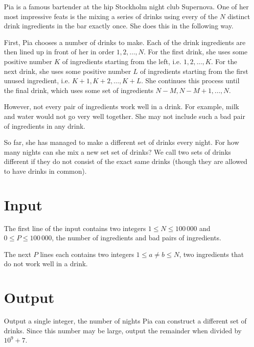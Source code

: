 Pia is a famous bartender at the hip Stockholm night club Supernova.
One of her most impressive feats is the mixing a series of drinks using every of the $N$ distinct drink ingredients in the bar exactly once.
She does this in the following way.

First, Pia chooses a number of drinks to make.
Each of the drink ingredients are then lined up in front of her in order $1, 2, \dots, N$.
For the first drink, she uses some positive number $K$ of ingredients starting from the left, i.e. $1, 2, ..., K$.
For the next drink, she uses some positive number $L$ of ingredients starting from the first unused ingredient, i.e. $K + 1, K + 2, \dots, K + L$.
She continues this process until the final drink, which uses some set of ingredients $N - M, N - M + 1, \dots, N$.

However, not every pair of ingredients work well in a drink.
For example, milk and water would not go very well together.
She may not include such a bad pair of ingredients in any drink.

So far, she has managed to make a different set of drinks every night.
For how many nights can she mix a new set set of drinks?
We call two sets of drinks different if they do not consist of the exact same drinks (though they are allowed to have drinks in common).

\section*{Input}
The first line of the input contains two integers $1 \le N \le 100\,000$ and $0 \le P \le 100\,000$, the number of ingredients and bad pairs of ingredients.

The next $P$ lines each contains two integers $1 \le a \not= b \le N$, two ingredients that do not work well in a drink.

\section*{Output}
Output a single integer, the number of nights Pia can construct a different set of drinks.
Since this number may be large, output the remainder when divided by $10^9 + 7$.
